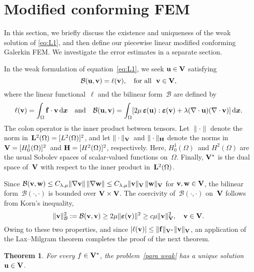\documentclass[11pt]{article}
\newcommand{\calB}{\mathcal{B}}
\newcommand{\vf}{{\bf f}}
\newcommand{\vu}{{\bf u}}
\newcommand{\vv}{{\bf v}}
\newcommand{\vV}{{\bf V}}
\newcommand{\vw}{{\bf w}}
\newcommand{\bsx}{{\boldsymbol{x}}}
\numberwithin{equation}{section}
\newcommand{\veps}{{\boldsymbol{\varepsilon}}}
\newcommand{\ud}{\mathrm{d}}
\newtheorem{theorem}{Theorem}[section]
\begin{document}
\section{Modified  conforming FEM}\label{Sec: FEM}
In this section, we briefly discuss the existence and uniqueness of the weak solution of \eqref{eq:L1}, and then define our piecewise linear modified conforming Galerkin FEM. We investigate the error estimates in a separate section.  

In the weak formulation of  equation~\eqref{eq:L1}, we seek $\vu \in \vV$ satisfying
\begin{equation}\label{para weak}
 \calB(\vu, \vv) = \ell(\vv), \quad \text{for all~~$\vv \in \vV$,}
\end{equation}
where the linear functional~$\ell$ and the bilinear form~$\calB$ are defined by
\begin{equation*}\label{eq: bilinear}
\ell(\vv) = \int_\Omega \vf \cdot \vv \,\ud\bsx 
 \quad\text{and}\quad
\calB(\vu,\vv)=\int_\Omega[2\mu\,\veps(\vu):\veps(\vv)+\lambda(\nabla\cdot\vu)
(\nabla\cdot\vv)]\,\ud\bsx.
\end{equation*}
The colon operator is the inner product between tensors.  Let $\|\cdot\|$ denote the norm 
in~${\bf L}^2(\Omega)=[L^2(\Omega)]^2$, and let $\|\cdot\|_{\bf V}$~and $\|\cdot\|_{\bf H}$ denote the 
norms in $\vV=[H^1_0(\Omega)]^2$~and ${\bf H}=[H^2(\Omega)]^2$, respectively. Here, $H^1_0(\Omega)$~and 
$H^2(\Omega)$ are the usual Sobolev spaces of scalar-valued functions on~$\Omega$.  Finally, $\vV^*$ is the 
dual space of~$\vV$ with respect to the inner product in~${\bf L}^2(\Omega)$. 
 
Since $\calB(\vv,\vw) \le C_{\lambda,\mu}\|\nabla \vv\|\,\|\nabla \vw\|
\le C_{\lambda,\mu}\| \vv\|_{\vV}\,\|\vw\|_{\vV}$ for $\vv,\vw \in \vV$, the bilinear 
form~$\calB(\cdot,\cdot)$ is bounded over $\vV \times \vV$. The coercivity of~$\calB(\cdot,\cdot)$ 
on~$\vV$ follows from Korn's inequality,
\begin{equation}\label{eq: coer B}
\|\vv\|_\calB^2:=\calB(\vv,\vv)\ge  2 \mu\|\veps(\vv)\|^2 \ge c \mu \| \vv\|_{\vV}^2, 
\quad \vv \in \vV.
\end{equation}
Owing to these two properties, and since $|\ell(\vv)|\le \|\vf\|_{\vV^*}\|\vv\|_{\vV}$,  an application of 
the Lax--Milgram theorem completes the proof of the next theorem.   

\begin{theorem}\label{thm: unique solution}
For every $f \in \vV^*$, the problem~\eqref{para weak} has a unique solution~$\vu\in\vV$. 
\end{theorem}
\end{document}
